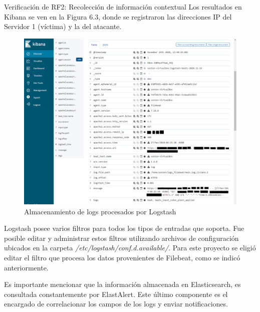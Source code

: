 \begin{section}{Verificación de RF2: Recolección de información contextual}
    Los resultados en Kibana se ven en la Figura 6.3, donde se registraron las direcciones IP del Servidor 1 (víctima) y la del atacante. \par
    \begin{figure}[H]
    \centering
        \includegraphics[width=1\textwidth]{./iteracion_2_imagenes/kibana_logs_parseados_2EDITADO.png}
        \caption{Almacenamiento de logs procesados por Logstash}
        \label{fig:iter2_logs_filtrados}
    \end{figure}
    
    Logstash posee varios filtros para todos los tipos de entradas que soporta. 
    Fue posible editar y administrar estos filtros utilizando archivos de configuración ubicados en la carpeta \textit{/etc/logstash/conf.d.available/}. Para este proyecto se eligió editar el filtro que procesa los datos provenientes de Filebeat, como se indicó anteriormente.\par
    Es importante mencionar que la información almacenada en Elasticsearch, es consultada constantemente por ElastAlert. Este último componente es el encargado de correlacionar los campos de los logs y enviar notificaciones.
    \end{section}
    \pagebreak
    
